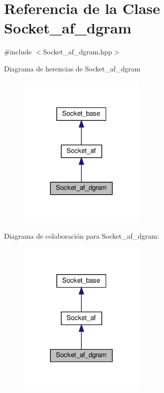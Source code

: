 \hypertarget{classSocket__af__dgram}{}\section{Referencia de la Clase Socket\+\_\+af\+\_\+dgram}
\label{classSocket__af__dgram}


{\ttfamily \#include $<$Socket\+\_\+af\+\_\+dgram.\+hpp$>$}



Diagrama de herencias de Socket\+\_\+af\+\_\+dgram
\nopagebreak
\begin{figure}[H]
\begin{center}
\leavevmode
\includegraphics[width=173pt]{classSocket__af__dgram__inherit__graph}
\end{center}
\end{figure}


Diagrama de colaboración para Socket\+\_\+af\+\_\+dgram\+:
\nopagebreak
\begin{figure}[H]
\begin{center}
\leavevmode
\includegraphics[width=173pt]{classSocket__af__dgram__coll__graph}
\end{center}
\end{figure}
